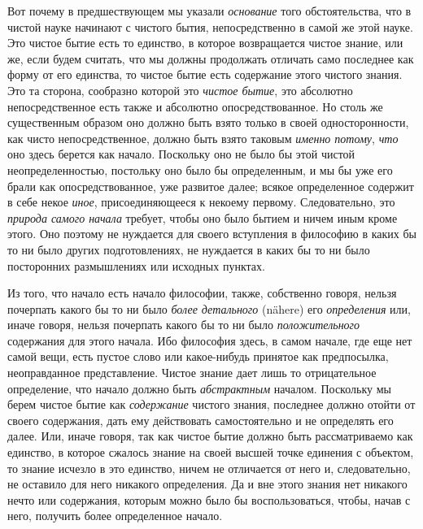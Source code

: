 Вот почему в предшествующем мы указали {\em основание}
того обстоятельства, что в чистой науке начинают с чистого бытия,
непосредственно в самой же этой науке. Это чистое бытие есть то единство, в
которое возвращается чистое знание, или же, если будем считать, что мы
должны продолжать отличать само последнее как форму от его единства, то
чистое бытие есть содержание этого чистого знания. Это та сторона,
сообразно которой это {\em чистое бытие}, это абсолютно
непосредственное есть также и абсолютно опосредствованное. Но столь же
существенным образом оно должно быть взято только в своей односторонности,
как чисто непосредственное, должно быть взято таковым
{\em именно потому}, {\em что} оно
здесь берется как начало. Поскольку оно не было бы этой чистой
неопределенностью, постольку оно было бы определенным, и мы бы уже его
брали как опосредствованное, уже развитое далее; всякое определенное
содержит в себе некое {\em иное}, присоединяющееся к
некоему первому. Следовательно, это {\em природа самого
начала} требует, чтобы оно было бытием и ничем иным кроме этого. Оно
поэтому не нуждается для своего вступления в философию в каких бы то ни
было других подготовлениях, не нуждается в каких бы то ни было посторонних
размышлениях или исходных пунктах.

Из того, что начало есть начало философии, также, собственно говоря, нельзя
почерпать какого бы то ни было {\em более детального}
(nähere) его {\em определения} или, иначе говоря,
нельзя почерпать какого бы то ни было
{\em положительного} содержания для этого начала. Ибо
философия здесь, в самом начале, где еще нет самой вещи, есть пустое слово
или какое-нибудь принятое как предпосылка, неоправданное представление.
Чистое знание дает лишь то отрицательное определение, что начало должно
быть {\em абстрактным} началом. Поскольку мы берем
чистое бытие как {\em содержание} чистого знания,
последнее должно отойти от своего содержания, дать ему действовать
самостоятельно и не определять его далее. Или, иначе говоря, так как чистое
бытие должно быть рассматриваемо как единство, в которое сжалось знание на
своей высшей точке единения с объектом, то знание исчезло в это единство,
ничем не отличается от него и, следовательно, не оставило для него никакого
определения. Да и вне этого знания нет никакого нечто или содержания,
которым можно было бы воспользоваться, чтобы, начав с него, получить более
определенное начало.

